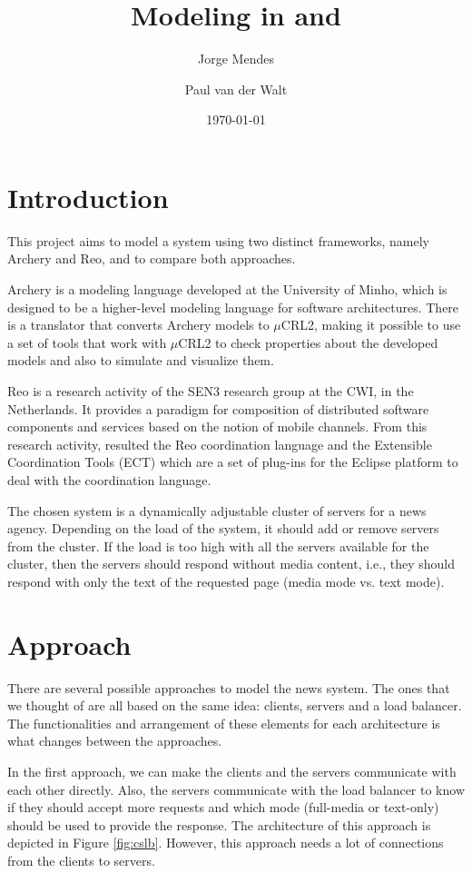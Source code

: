 \documentclass[a4paper]{article}
\author{Jorge Mendes \and Paul van der Walt}
\date{\today}
\title{Modeling in \ar and \re}
\newcommand{\ar}{Archery\xspace}
\newcommand{\re}{Reo\xspace}
\newcommand{\mcrl}{$\mu$CRL2\xspace}
\begin{document}
\maketitle

%
%
\section{Introduction}

This project aims to model a system using two distinct frameworks, namely \ar
and \re, and to compare both approaches.

\ar is a modeling language developed at the University of Minho, which is designed
to be a higher-level modeling language for software architectures. There is a translator
that converts \ar models to \mcrl, making it possible to use a set of tools that work with
\mcrl to check properties about the developed models and also to simulate and visualize them.

\re is a research activity of the SEN3 research group at the CWI, in the
Netherlands. It provides a paradigm for composition of distributed software
components and services based on the notion of mobile channels.
From this research activity, resulted the \re coordination language and the
Extensible Coordination Tools (ECT) which are a set of plug-ins for the Eclipse
platform to deal with the coordination language.

The chosen system is a dynamically adjustable cluster of servers for a news
agency. Depending on the load of the system, it should add or remove servers
from the cluster. If the load is too high with all the servers available for
the cluster, then the servers should respond without media content, i.e., they
should respond with only the text of the requested page (media mode vs. text
mode).



%
%
\section{Approach}

There are several possible approaches to model the news system. The ones that we
thought of are all based on the same idea: clients, servers and a load balancer. The
functionalities and arrangement of these elements for each architecture is what
changes between the approaches.

In the first approach, we can make the clients and the servers communicate with
each other
directly. Also, the servers communicate with the load balancer to
know if they should accept more requests and which mode (full-media or
text-only) should be used to provide the response. The architecture of this
approach is depicted in Figure \ref{fig:cslb}. However, this approach needs
a lot of connections from the clients to servers.
\end{document}
